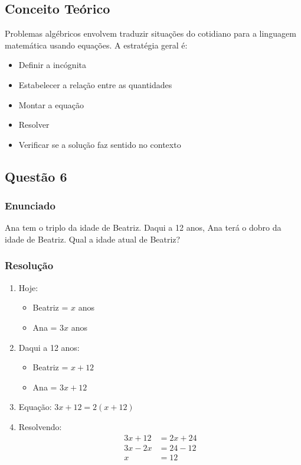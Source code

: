 \documentclass[11pt]{article}
\begin{document}
\subsection{Conceito Teórico}
Problemas algébricos envolvem traduzir situações do cotidiano para a linguagem matemática usando equações. A estratégia geral é:
\begin{itemize}
\item Definir a incógnita
\item Estabelecer a relação entre as quantidades
\item Montar a equação
\item Resolver
\item Verificar se a solução faz sentido no contexto
\end{itemize}

\subsection{Questão 6}
\subsubsection*{Enunciado}
Ana tem o triplo da idade de Beatriz. Daqui a 12 anos, Ana terá o dobro da idade de Beatriz. Qual a idade atual de Beatriz?

\subsubsection*{Resolução}
\begin{enumerate}
\item Hoje:
\begin{itemize}
\item Beatriz = $x$ anos
\item Ana = $3x$ anos
\end{itemize}
\item Daqui a 12 anos:
\begin{itemize}
\item Beatriz = $x + 12$
\item Ana = $3x + 12$
\end{itemize}
\item Equação: $3x + 12 = 2(x + 12)$
\item Resolvendo:
\begin{align*}
3x + 12 &= 2x + 24 \\
3x - 2x &= 24 - 12 \\
x &= 12
\end{align*}
\end{enumerate}
\end{document}
